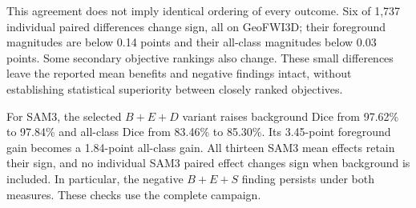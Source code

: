 \documentclass[12pt,a4paper]{article}
\begin{document}
This agreement does not imply identical ordering of every outcome.
Six of 1,737 individual paired differences change sign, all on
GeoFWI3D; their foreground magnitudes are below 0.14 points and
their all-class magnitudes below 0.03 points. Some secondary objective
rankings also change. These small differences leave the reported
mean benefits and negative findings intact, without establishing
statistical superiority between closely ranked objectives.

For SAM3, the selected $B+E+D$ variant raises background Dice
from 97.62\% to 97.84\% and all-class Dice from 83.46\% to
85.30\%. Its 3.45-point foreground gain becomes a 1.84-point
all-class gain. All thirteen SAM3 mean effects retain their sign,
and no individual SAM3 paired effect changes sign when background
is included. In particular, the negative $B+E+S$ finding persists
under both measures. These checks use the complete campaign.

\FloatBarrier
\end{document}
